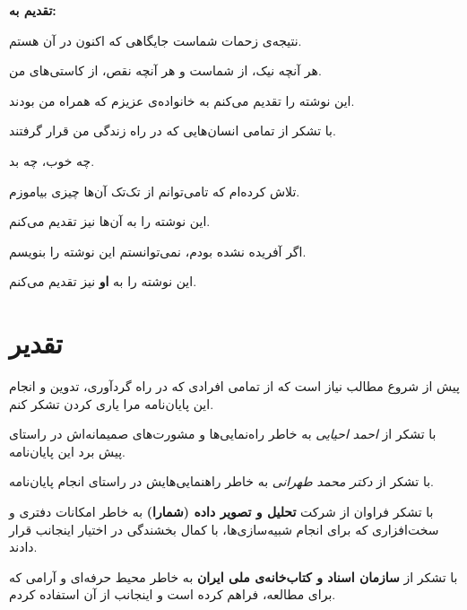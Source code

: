 \documentclass[a4paper,11px]{article}
\begin{document}
{\Large
\textbf{
تقدیم به:
}

\vfill

نتیجه‌ی زحمات شماست جایگاهی که اکنون در آن هستم.

هر آنچه نیک، از شماست و هر آنچه نقص، از کاستی‌های من.

این نوشته را تقدیم می‌کنم به خانواده‌ی عزیزم که همراه من بودند.

\vfill

با تشکر از تمامی انسان‌هایی که در راه زندگی من قرار گرفتند.

چه خوب، چه بد.

تلاش کرده‌ام که تامی‌توانم از تک‌تک آن‌ها چیزی بیاموزم.

این نوشته را به آن‌ها نیز تقدیم می‌کنم.

\vfill


اگر آفریده نشده بودم، نمی‌توانستم این نوشته را بنویسم.

این نوشته را به 
\textbf{
او
} 
نیز تقدیم می‌کنم.


}

\vfill
\newpage




\section*{
تقدیر
}

پیش از شروع مطالب نیاز است که از تمامی افرادی که در راه گردآوری، تدوین و انجام این پایان‌نامه مرا یاری کردن تشکر کنم.

\vspace{10mm}

با تشکر از 
\textit{
احمد احیایی
} 
به خاطر راه‌نمایی‌ها و مشورت‌های صمیمانه‌اش در راستای پیش برد این پایان‌نامه.

\vspace{10mm}

با تشکر از 
\textit{
دکتر محمد طهرانی
} 
به خاطر راهنمایی‌هایش در راستای انجام پایان‌نامه.

\vspace{10mm}

با تشکر فراوان از شرکت 
\textbf{
تحلیل و تصویر داده (شمارا)
} 
به خاطر امکانات دفتری و سخت‌افزاری که برای انجام شبیه‌سازی‌ها، با کمال بخشندگی در اختیار اینجانب قرار دادند.

\vspace{10mm}
با تشکر از 
\textbf{
سازمان اسناد و کتاب‌خانه‌ی ملی ایران
} 
به خاطر محیط حرفه‌ای و آرامی که برای مطالعه، فراهم کرده است و اینجانب از آن استفاده کردم.
\end{document}

